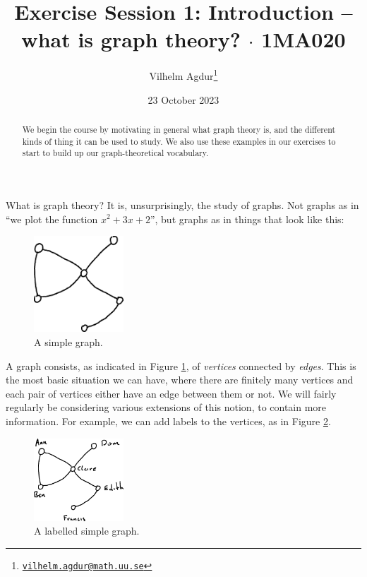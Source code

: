 \documentclass[nobib]{tufte-handout}
\title{Exercise Session 1: Introduction -- what is graph theory? $\cdot$ 1MA020}
\author[Vilhelm Agdur]{Vilhelm Agdur\thanks{\href{mailto:vilhelm.agdur@math.uu.se}{\nolinkurl{vilhelm.agdur@math.uu.se}}}}
\date{23 October 2023}
\begin{document}
\maketitle%

\begin{abstract}
\noindent
We begin the course by motivating in general what graph theory is, and the different kinds of thing it can be used to study. We also use these examples in our exercises to start to build up our graph-theoretical vocabulary.
\end{abstract}

What is graph theory? It is, unsurprisingly, the study of graphs. Not graphs as in ``we plot the function $x^2+3x+2$'', but graphs as in things that look like this:

\begin{figure}
  \centering
  \includegraphics[width=0.3\textwidth]{graphics/L1_exc/unlabeled_simple_graph.png}
  \caption{A simple graph.}
  \label{fig:simple_graph}
\end{figure}

A graph consists, as indicated in Figure \ref{fig:simple_graph}, of \emph{vertices} connected by \emph{edges}. This is the most basic situation we can have, where there are finitely many vertices and each pair of vertices either have an edge between them or not. We will fairly regularly be considering various extensions of this notion, to contain more information. For example, we can add labels to the vertices, as in Figure \ref{fig:labelled_simple_graph}.

\begin{figure}
  \centering
  \includegraphics[width=0.3\textwidth]{graphics/L1_exc/labeled_simple_graph.png}
  \caption{A labelled simple graph.}
  \label{fig:labelled_simple_graph}
\end{figure}
\end{document}

